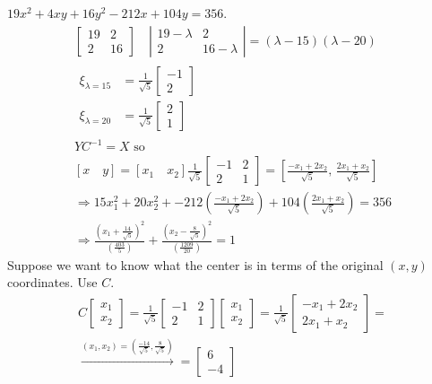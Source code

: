 \documentclass[twoside]{amsart}
\theoremstyle{plain}
\theoremstyle{definition}
\newcommand{\exercisehead}[1]
  {
   \noindent{\small\bf Exercise #1.}
   \smallskip}
\begin{document}
\exercisehead{12} $19 x^2 + 4xy + 16 y^2 -212 x + 104y =356$.  
\[
\begin{gathered}
  \left[ \begin{matrix} 19 & 2 \\ 2 & 16 \end{matrix} \right] \quad \left| \begin{matrix} 19-\lambda & 2 \\ 2 & 16 -\lambda \end{matrix} \right| = (\lambda -15)(\lambda-20) \\
  \begin{aligned}
  \xi_{\lambda = 15} & = \frac{1}{\sqrt{5}} \left[ \begin{matrix} -1 \\ 2 \end{matrix} \right] \\ 
  \xi_{\lambda = 20 } & = \frac{1}{ \sqrt{5}} \left[ \begin{matrix} 2 \\ 1 \end{matrix} \right]  
  \end{aligned} \\
  YC^{-1} = X \text{ so } \\
  [x \quad  y ] = [ x_1 \quad x_2 ] \frac{1}{ \sqrt{5}} \left[ \begin{matrix} -1 & 2 \\ 2 & 1 \end{matrix} \right] = \left[ \frac{ -x_1 + 2x_2}{ \sqrt{5}}, \, \frac{2x_1 + x_2}{ \sqrt{5}} \right] \\
  \Longrightarrow 15 x_1^2 + 20 x_2^2 + -212 \left( \frac{ -x_1 + 2x_2 }{ \sqrt{5}} \right) + 104 \left( \frac{2x_1 + x_2}{ \sqrt{5}} \right) =356 \\
  \Longrightarrow \frac{ \left( x_1 + \frac{14}{\sqrt{5}} \right)^2 }{ \left( \frac{403}{5} \right)} + \frac{ \left( x_2 - \frac{8}{\sqrt{5}} \right)^2 }{ \left( \frac{1209}{20} \right) } =1 
\end{gathered}
\]
Suppose we want to know what the center is in terms of the original $(x,y)$ coordinates.  Use $C$.  
\[
\begin{gathered}
C \left[ \begin{matrix} x_1 \\ x_2 \end{matrix} \right] = \frac{1}{\sqrt{5}} \left[ \begin{matrix} -1 & 2 \\ 2  & 1 \end{matrix} \right] \left[ \begin{matrix} x_1 \\ x_2 \end{matrix} \right] = \frac{1}{\sqrt{5}} \left[ \begin{matrix} -x_1 + 2x_2 \\ 2x_1 + x_2 \end{matrix} \right] = \\
\xrightarrow{ (x_1,x_2) = \left( \frac{-14}{ \sqrt{5}}, \frac{8}{\sqrt{5}} \right)} = \left[ \begin{matrix} 6 \\ -4 \end{matrix} \right]
\end{gathered}
\]
\end{document}
